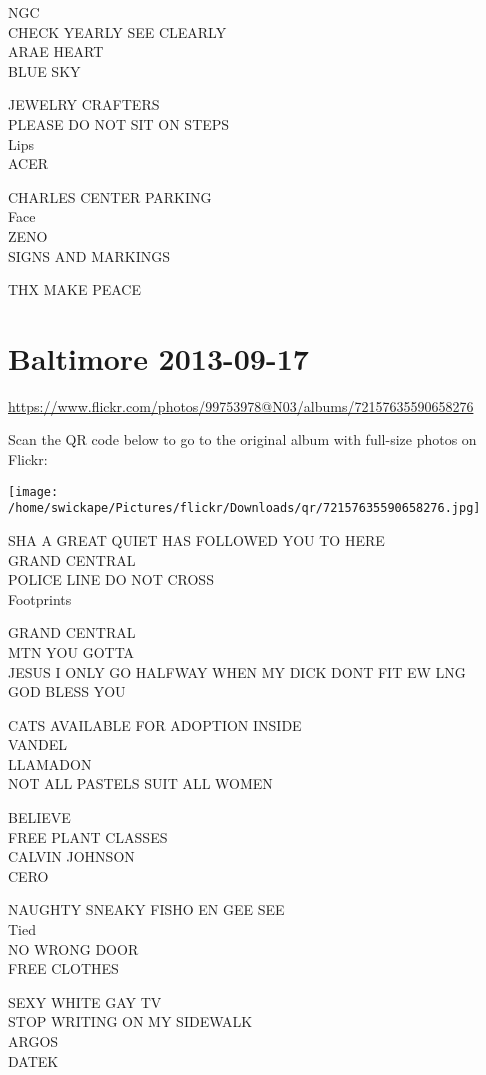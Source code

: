 \documentclass[10pt,letterpaper]{article}
\begin{document}
NGC\\
CHECK YEARLY SEE CLEARLY\\
ARAE HEART\\
BLUE SKY

JEWELRY CRAFTERS\\
PLEASE DO NOT SIT ON STEPS\\
Lips\\
ACER

CHARLES CENTER PARKING\\
Face\\
ZENO\\
SIGNS AND MARKINGS

THX MAKE PEACE


\section*{Baltimore 2013-09-17}

\url{https://www.flickr.com/photos/99753978@N03/albums/72157635590658276}

Scan the QR code below to go to the original album with full-size photos on Flickr:

\texttt{[image: /home/swickape/Pictures/flickr/Downloads/qr/72157635590658276.jpg]}


SHA A GREAT QUIET HAS FOLLOWED YOU TO HERE\\
GRAND CENTRAL\\
POLICE LINE DO NOT CROSS\\
Footprints

GRAND CENTRAL\\
MTN YOU GOTTA\\
JESUS I ONLY GO HALFWAY WHEN MY DICK DONT FIT EW LNG\\
GOD BLESS YOU

CATS AVAILABLE FOR ADOPTION INSIDE\\
VANDEL\\
LLAMADON\\
NOT ALL PASTELS SUIT ALL WOMEN

BELIEVE\\
FREE PLANT CLASSES\\
CALVIN JOHNSON\\
CERO

NAUGHTY SNEAKY FISHO EN GEE SEE\\
Tied\\
NO WRONG DOOR\\
FREE CLOTHES

SEXY WHITE GAY TV\\
STOP WRITING ON MY SIDEWALK\\
ARGOS\\
DATEK
\end{document}
